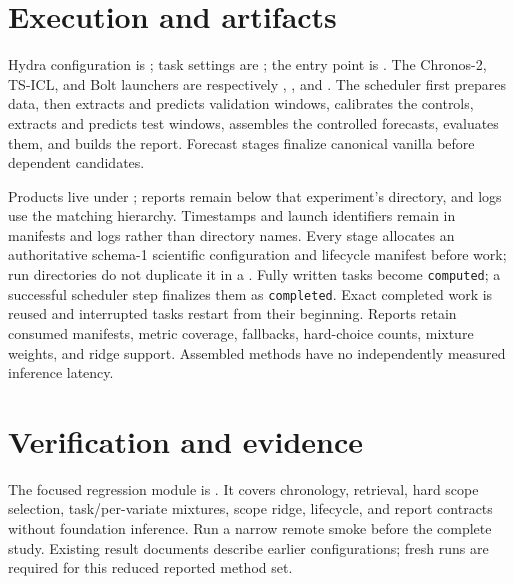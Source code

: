 \documentclass[11pt]{article}
\begin{document}
\section{Execution and artifacts}
Hydra configuration is ; task settings
are ; the entry point is
. The Chronos-2, TS-ICL, and Bolt launchers
are respectively ,
, and
. The scheduler first prepares data, then
extracts and predicts validation windows, calibrates the controls, extracts and
predicts test windows, assembles the controlled forecasts, evaluates them, and
builds the report.
Forecast stages finalize canonical vanilla before dependent candidates.

Products live under ;
reports remain below that experiment's  directory, and logs use
the matching  hierarchy. Timestamps and
launch identifiers remain in manifests and logs rather than directory names.
Every stage allocates an authoritative schema-1 scientific configuration and
lifecycle manifest before work; run directories do not duplicate it in a
. Fully written tasks
become \texttt{computed}; a successful scheduler step finalizes them as
\texttt{completed}. Exact completed work is reused and interrupted tasks restart
from their beginning. Reports retain consumed manifests, metric coverage,
fallbacks, hard-choice counts, mixture weights, and ridge support. Assembled
methods have no independently measured inference latency.

\section{Verification and evidence}
The focused regression module is
. It covers chronology, retrieval,
hard scope selection, task/per-variate mixtures, scope ridge, lifecycle, and
report contracts without foundation inference. Run a narrow remote smoke before
the complete study. Existing result documents describe earlier configurations;
fresh runs are required for this reduced reported method set.
\end{document}
